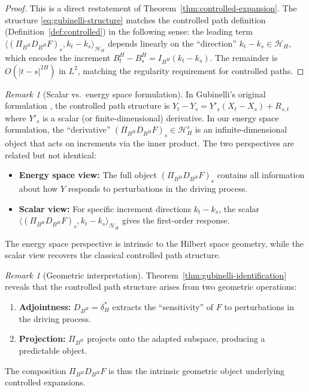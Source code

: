 \documentclass[11pt,a4paper]{article}
\theoremstyle{plain}
\theoremstyle{definition}
\theoremstyle{remark}
\newtheorem{remark}[theorem]{Remark}
\newcommand{\ip}[2]{\langle #1, #2 \rangle}
\newcommand{\HH}{\mathcal{H}_H}
\begin{document}
\begin{proof}
This is a direct restatement of Theorem~\ref{thm:controlled-expansion}. The structure \eqref{eq:gubinelli-structure} matches the controlled path definition (Definition~\ref{def:controlled}) in the following sense: the leading term $\ip{(\Pi_{B^H} D_{B^H} F)_s}{k_t - k_s}_{\HH}$ depends linearly on the ``direction'' $k_t - k_s \in \HH$, which encodes the increment $B^H_t - B^H_s = I_{B^H}(k_t - k_s)$. The remainder is $O(|t-s|^{2H})$ in $L^2$, matching the regularity requirement for controlled paths.
\end{proof}

\begin{remark}[Scalar vs.\ energy space formulation]\label{rem:scalar-vs-energy}
In Gubinelli's original formulation \cite{Gubinelli04}, the controlled path structure is $Y_t - Y_s = Y'_s(X_t - X_s) + R_{s,t}$ where $Y'_s$ is a scalar (or finite-dimensional) derivative. In our energy space formulation, the ``derivative'' $(\Pi_{B^H} D_{B^H} F)_s \in \HH^s$ is an infinite-dimensional object that acts on increments via the inner product. The two perspectives are related but not identical:
\begin{itemize}
\item \textbf{Energy space view:} The full object $(\Pi_{B^H} D_{B^H} F)_s$ contains all information about how $Y$ responds to perturbations in the driving process.
\item \textbf{Scalar view:} For specific increment directions $k_t - k_s$, the scalar $\ip{(\Pi_{B^H} D_{B^H} F)_s}{k_t - k_s}_{\HH}$ gives the first-order response.
\end{itemize}
The energy space perspective is intrinsic to the Hilbert space geometry, while the scalar view recovers the classical controlled path structure.
\end{remark}

\begin{remark}[Geometric interpretation]\label{rem:geometric}
Theorem~\ref{thm:gubinelli-identification} reveals that the controlled path structure arises from two geometric operations:
\begin{enumerate}
\item \textbf{Adjointness:} $D_{B^H} = \delta_H^*$ extracts the ``sensitivity'' of $F$ to perturbations in the driving process.
\item \textbf{Projection:} $\Pi_{B^H}$ projects onto the adapted subspace, producing a predictable object.
\end{enumerate}
The composition $\Pi_{B^H} D_{B^H} F$ is thus the intrinsic geometric object underlying controlled expansions.
\end{remark}
\end{document}
